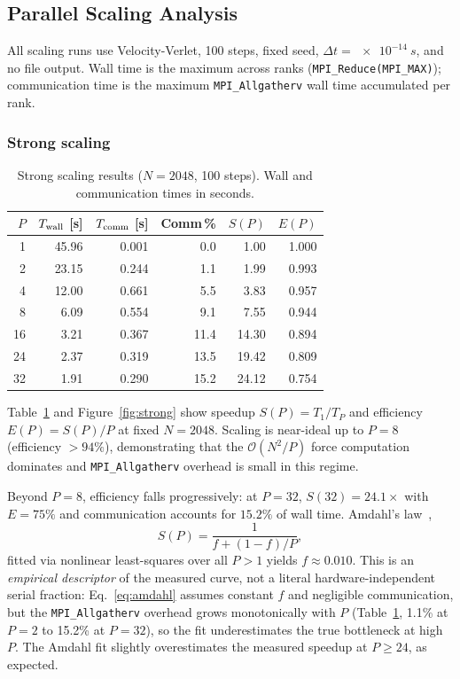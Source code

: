 \documentclass[10pt,twocolumn]{article}
\begin{document}
\subsection{Parallel Scaling Analysis}
\label{sec:scaling}

All scaling runs use Velocity-Verlet, 100 steps, fixed seed,
$\Delta t=\SI{e-14}{s}$, and no file output.
Wall time is the maximum across ranks (\texttt{MPI\_Reduce(MPI\_MAX)});
communication time is the maximum \texttt{MPI\_Allgatherv} wall time
accumulated per rank.

\subsubsection*{Strong scaling}

\begin{table}[ht]
  \centering
  \caption{Strong scaling results ($N=2048$, 100 steps).
    Wall and communication times in seconds.}
  \label{tab:strong}
  \small\setlength{\tabcolsep}{3pt}
  \begin{tabular}{@{}rrrrrr@{}}
    \toprule
    $P$ & $T_{\rm wall}$ [s] & $T_{\rm comm}$ [s] & Comm\,\% & $S(P)$ & $E(P)$ \\
    \midrule
     1 & 45.96 & 0.001 &  0.0 &  1.00 & 1.000 \\
     2 & 23.15 & 0.244 &  1.1 &  1.99 & 0.993 \\
     4 & 12.00 & 0.661 &  5.5 &  3.83 & 0.957 \\
     8 &  6.09 & 0.554 &  9.1 &  7.55 & 0.944 \\
    16 &  3.21 & 0.367 & 11.4 & 14.30 & 0.894 \\
    24 &  2.37 & 0.319 & 13.5 & 19.42 & 0.809 \\
    32 &  1.91 & 0.290 & 15.2 & 24.12 & 0.754 \\
    \bottomrule
  \end{tabular}
\end{table}

Table~\ref{tab:strong} and Figure~\ref{fig:strong} show speedup
$S(P)=T_1/T_P$ and efficiency $E(P)=S(P)/P$ at fixed $N=2048$.
Scaling is near-ideal up to $P=8$ (efficiency $>94\%$), demonstrating that
the $\mathcal{O}(N^2/P)$ force computation dominates and \texttt{MPI\_Allgatherv}
overhead is small in this regime.

Beyond $P=8$, efficiency falls progressively: at $P=32$, $S(32)=24.1\times$
with $E=75\%$ and communication accounts for $15.2\%$ of wall time.
Amdahl's law~\citep{Amdahl1967},
\begin{equation}
  S(P) = \frac{1}{f + (1-f)/P}, \label{eq:amdahl}
\end{equation}
fitted via nonlinear least-squares over all $P>1$ yields $f\approx0.010$.
This is an \emph{empirical descriptor} of the measured curve, not a literal
hardware-independent serial fraction: Eq.~\eqref{eq:amdahl} assumes constant
$f$ and negligible communication, but the \texttt{MPI\_Allgatherv} overhead
grows monotonically with $P$ (Table~\ref{tab:strong}, 1.1\% at $P=2$ to
15.2\% at $P=32$), so the fit underestimates the true bottleneck at high $P$.
The Amdahl fit slightly overestimates the measured speedup at $P\ge 24$,
as expected.
\end{document}
